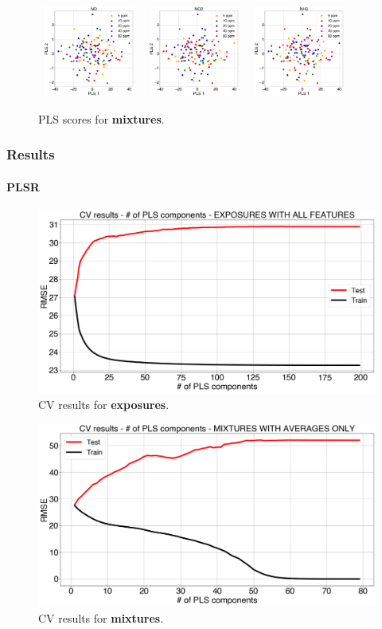 \documentclass{beamer}
\begin{document}
\begin{frame}
		\begin{figure}
			\includegraphics[width=0.30\textwidth, height = 3cm, keepaspectratio]{../../figures/plsNO-avg-feat.png}
			\hfill
			\includegraphics[width=0.30\textwidth, height = 3cm, keepaspectratio]{../../figures/plsNO2-avg-feat.png}
			\hfill
			\includegraphics[width=0.30\textwidth, height = 3cm, keepaspectratio]{../../figures/plsNH3-avg-feat.png}
			\caption{PLS scores for \textbf{mixtures}.}
			\label{fig:pls-avg-only}
		\end{figure}
	
\end{frame}

\begin{frame}
	\frametitle{Results}
	\framesubtitle{PLSR}
	

		
		\begin{figure}
			\includegraphics[width=0.5\linewidth]{../../figures/pls-cv.png}
			\caption{CV results for \textbf{exposures}.}
			\label{fig:pls-cv} 
		\end{figure}
		
		\begin{figure}
			\includegraphics[width=0.5\linewidth]{../../figures/pls-cv-avg-feat.png}
			\caption{CV results for \textbf{mixtures}.}
			\label{fig:pls-cv-avg-feat}
		\end{figure}
	

	
\end{frame}
\end{document}
